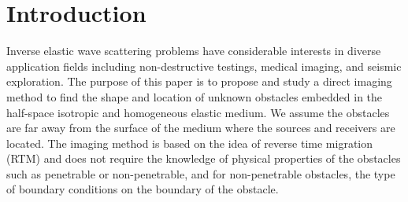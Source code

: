 \documentclass[12pt]{iopart}
\begin{document}
\newcommand{\N}{\mathbb{N}}
\newcommand{\D}{\mathbb{D}}
\newcommand{\T}{\mathbb{T}}
\newcommand{\A}{\mathbb{A}}
\newcommand{\B}{\mathbb{B}}
\newcommand{\G}{\mathbb{G}}
\newcommand{\F}{\mathbb{F}}
\newcommand{\R}{\mathbb{R}}
\newcommand{\W}{\mathbb{W}}
\newcommand{\V}{\mathbb{V}}
\newcommand{\U}{\mathbb{U}}
\newcommand{\J}{\mathbb{J}}
\newcommand{\Zg}{\mathbb{Z}}
\newcommand{\Gtheta}{\mathbb{\Theta}}
\newcommand{\Gphi}{\mathbb{\Phi}}

\newcommand{\be}{\begin{eqnarray}}
\newcommand{\ee}{\end{eqnarray}}
\newcommand{\ben}{\begin{eqnarray*}}
	\newcommand{\een}{\end{eqnarray*}}
\newcommand{\nn}{\nonumber}

\section{Introduction}\label{section1}

Inverse elastic wave scattering problems have considerable interests in diverse application fields including non-destructive testings, medical imaging, and seismic exploration. The purpose of this paper is to propose and study a direct imaging method to find
the shape and location of unknown obstacles embedded in the half-space isotropic and homogeneous elastic medium. We assume the obstacles are far away from the surface of the medium where the sources and receivers are located. The imaging method is
based on the idea of reverse time migration (RTM) and does not require the knowledge of 
physical properties of the obstacles such as penetrable or non-penetrable, and for non-penetrable obstacles, the type of boundary conditions on the boundary of the obstacle.
\end{document}
